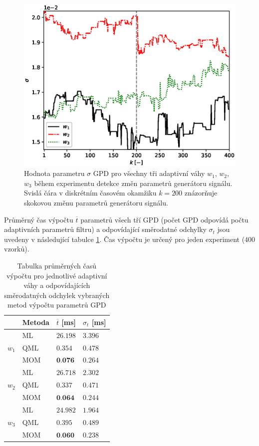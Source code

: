 \begin{figure}[h!]

	\centering
	\includegraphics[scale=0.71]{IMG/appel_par/par_sigma.eps}
	\caption{Hodnota parametru $\sigma$ GPD pro všechny tři adaptivní váhy $w_1$, $w_2$, $w_3$ během experimentu detekce změn parametrů generátoru signálu. Svislá čára v diskrétním časovém okamžiku $k=200$ znázorňuje skokovou změnu parametrů generátoru signálu.}
		\label{fig:par_sigma}
\end{figure}
Průměrný čas výpočtu $\overline{t}$ parametrů všech tří GPD (počet GPD odpovídá počtu adaptivních parametrů filtru) a odpovídající směrodatné odchylky $\sigma_t$ jsou uvedeny v následující tabulce \ref{tab:par_results}. Čas výpočtu je určený pro jeden experiment (400 vzorků).
\begin{table}[h!]

\centering
\caption{Tabulka průměrných časů výpočtu pro jednotlivé adaptivní váhy a odpovídajících směrodatných odchylek vybraných metod výpočtu parametrů GPD}
\begin{tabular}{|l|l||l|l|}
\hline
 & Metoda & $\overline{t}$ {[}ms{]} & $\sigma_t$ {[}ms{]} \\ \hline \hline
\multirow{3}{*}{$w_1$} & ML & $26.198$ & $3.396$ \\ \cline{2-4} 
 & QML & $0.354$ & $0.478$ \\ \cline{2-4} 
 & MOM & $\textbf{0.076}$ & $0.264$ \\ \hline
\multirow{3}{*}{$w_2$} & ML & $26.718$ & $2.302$ \\ \cline{2-4} 
 & QML & $0.337$ & $0.471$ \\ \cline{2-4} 
 & MOM & $\textbf{0.064}$ & $0.244$ \\ \hline
\multirow{3}{*}{$w_3$} & ML & $24.982$ & $1.964$ \\ \cline{2-4} 
 & QML & $0.395$ & $0.489$ \\ \cline{2-4} 
 & MOM & $\textbf{0.060}$ & $0.238$ \\ \hline

\end{tabular}
 \label{tab:par_results}
\end{table}

